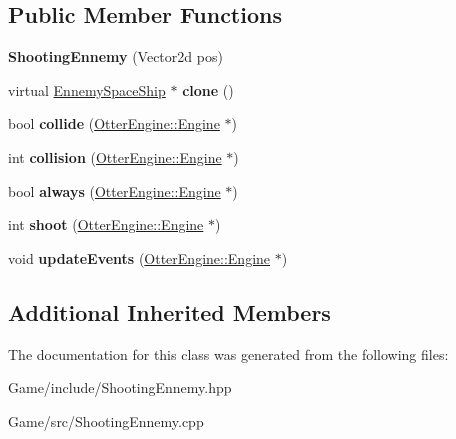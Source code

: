 \subsection*{Public Member Functions}
\begin{DoxyCompactItemize}
\item 
{\bfseries Shooting\+Ennemy} (Vector2d pos)\hypertarget{class_shooting_ennemy_a7bf77060e5bd98b8328c8d4e859dc9d8}{}\label{class_shooting_ennemy_a7bf77060e5bd98b8328c8d4e859dc9d8}

\item 
virtual \hyperlink{class_ennemy_space_ship}{Ennemy\+Space\+Ship} $\ast$ {\bfseries clone} ()\hypertarget{class_shooting_ennemy_a62c6199eeb2df70c975d9c396c221c35}{}\label{class_shooting_ennemy_a62c6199eeb2df70c975d9c396c221c35}

\item 
bool {\bfseries collide} (\hyperlink{class_otter_engine_1_1_engine}{Otter\+Engine\+::\+Engine} $\ast$)\hypertarget{class_shooting_ennemy_a09044fcfd37fd4883d6b226d52319c86}{}\label{class_shooting_ennemy_a09044fcfd37fd4883d6b226d52319c86}

\item 
int {\bfseries collision} (\hyperlink{class_otter_engine_1_1_engine}{Otter\+Engine\+::\+Engine} $\ast$)\hypertarget{class_shooting_ennemy_aa322ea0dc69b9ca1145a2742685b9c68}{}\label{class_shooting_ennemy_aa322ea0dc69b9ca1145a2742685b9c68}

\item 
bool {\bfseries always} (\hyperlink{class_otter_engine_1_1_engine}{Otter\+Engine\+::\+Engine} $\ast$)\hypertarget{class_shooting_ennemy_a6af922877a25063b771083ba489ef6ca}{}\label{class_shooting_ennemy_a6af922877a25063b771083ba489ef6ca}

\item 
int {\bfseries shoot} (\hyperlink{class_otter_engine_1_1_engine}{Otter\+Engine\+::\+Engine} $\ast$)\hypertarget{class_shooting_ennemy_aefe5ff984ff83c64ae0cd5078591a0ea}{}\label{class_shooting_ennemy_aefe5ff984ff83c64ae0cd5078591a0ea}

\item 
void {\bfseries update\+Events} (\hyperlink{class_otter_engine_1_1_engine}{Otter\+Engine\+::\+Engine} $\ast$)\hypertarget{class_shooting_ennemy_aeaab75db1deacbd6063a861a674ecabc}{}\label{class_shooting_ennemy_aeaab75db1deacbd6063a861a674ecabc}

\end{DoxyCompactItemize}
\subsection*{Additional Inherited Members}


The documentation for this class was generated from the following files\+:\begin{DoxyCompactItemize}
\item 
Game/include/Shooting\+Ennemy.\+hpp\item 
Game/src/Shooting\+Ennemy.\+cpp\end{DoxyCompactItemize}
